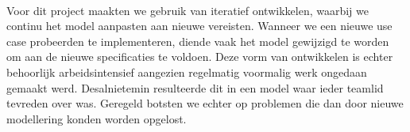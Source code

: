 \label{besluit}
\paragraph{}
Voor dit project maakten we gebruik van iteratief ontwikkelen, waarbij we continu het model aanpasten aan nieuwe vereisten. Wanneer we een nieuwe use case probeerden te implementeren, diende vaak het model gewijzigd te worden om aan de nieuwe specificaties te voldoen. Deze vorm van ontwikkelen is echter behoorlijk arbeidsintensief aangezien regelmatig voormalig werk ongedaan gemaakt werd. Desalnietemin resulteerde dit in een model waar ieder teamlid tevreden over was. Geregeld botsten we echter op problemen die dan door nieuwe modellering konden worden opgelost.